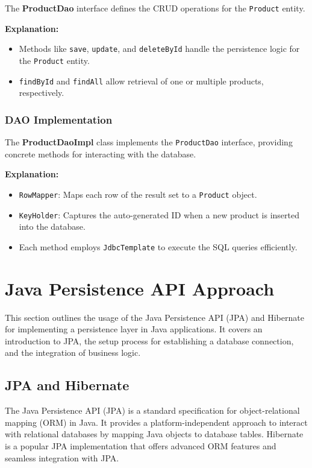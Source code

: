 \documentclass{article}
\begin{document}
The \textbf{ProductDao} interface defines the CRUD operations for the \texttt{Product} entity.

\textbf{Explanation:}
\begin{itemize}
    \item Methods like \texttt{save}, \texttt{update}, and \texttt{deleteById} handle the persistence logic for the \texttt{Product} entity.
    \item \texttt{findById} and \texttt{findAll} allow retrieval of one or multiple products, respectively.
\end{itemize}

\subsubsection{DAO Implementation}

The \textbf{ProductDaoImpl} class implements the \texttt{ProductDao} interface, providing concrete methods for interacting with the database.

\textbf{Explanation:}
\begin{itemize}
    \item \texttt{RowMapper}: Maps each row of the result set to a \texttt{Product} object.
    \item \texttt{KeyHolder}: Captures the auto-generated ID when a new product is inserted into the database.
    \item Each method employs \texttt{JdbcTemplate} to execute the SQL queries efficiently.
\end{itemize}

\section{Java Persistence API Approach }

This section outlines the usage of the Java Persistence API (JPA) and Hibernate for implementing a persistence layer in Java applications. It covers an introduction to JPA, the setup process for establishing a database connection, and the integration of business logic.

\subsection{JPA and Hibernate}

The Java Persistence API (JPA) is a standard specification for object-relational mapping (ORM) in Java. It provides a platform-independent approach to interact with relational databases by mapping Java objects to database tables. Hibernate is a popular JPA implementation that offers advanced ORM features and seamless integration with JPA.
\end{document}
